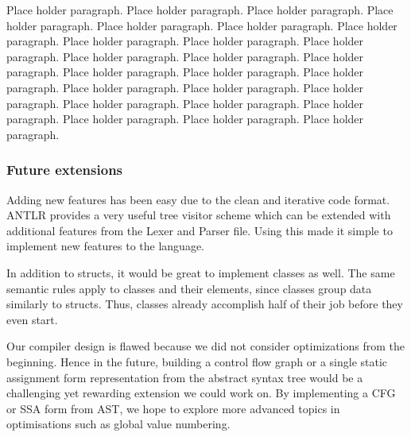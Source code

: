 \documentclass[a4paper,12pt]{article}
\begin{document}
Place holder paragraph. Place holder paragraph. Place holder paragraph. Place holder paragraph. Place holder paragraph. Place holder paragraph. Place holder paragraph. Place holder paragraph. Place holder paragraph. Place holder paragraph. Place holder paragraph. Place holder paragraph. Place holder paragraph. Place holder paragraph. Place holder paragraph. Place holder paragraph. Place holder paragraph. Place holder paragraph. Place holder paragraph. Place holder paragraph. Place holder paragraph. Place holder paragraph. Place holder paragraph. Place holder paragraph. Place holder paragraph. 

\subsubsection*{Future extensions}

Adding new features has been easy due to the clean and iterative code format. ANTLR provides a very useful tree visitor scheme which can be extended with additional features from the Lexer and Parser file. Using this made it simple to implement new features to the language.

In addition to structs, it would be great to implement classes as well. The same semantic rules apply to classes and their elements, since classes group data similarly to structs. Thus, classes already accomplish half of their job before they even start.

Our compiler design is flawed because we did not consider optimizations from the beginning. Hence in the future, building a control flow graph or a single static assignment form representation from the abstract syntax tree would be a challenging yet rewarding extension we could work on. By implementing a CFG or SSA form from AST, we hope to explore more advanced topics in optimisations such as global value numbering.
\end{document}
